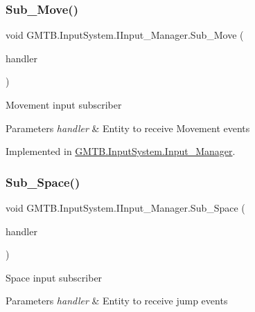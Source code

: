 \subsubsection{\texorpdfstring{Sub\_Move()}{Sub\_Move()}}
{\footnotesize\ttfamily void G\+M\+T\+B.\+Input\+System.\+I\+Input\+\_\+\+Manager.\+Sub\+\_\+\+Move (\begin{DoxyParamCaption}\item[{Event\+Handler$<$ \mbox{\hyperlink{class_g_m_t_b_1_1_input_system_1_1_input_event}{Input\+Event}} $>$}]{handler }\end{DoxyParamCaption})}



Movement input subscriber 


\begin{DoxyParams}{Parameters}
{\em handler} & Entity to receive Movement events\\
\hline
\end{DoxyParams}


Implemented in \mbox{\hyperlink{class_g_m_t_b_1_1_input_system_1_1_input___manager_aa5c3ef995d84d51c4c8d13853b6f18d1}{G\+M\+T\+B.\+Input\+System.\+Input\+\_\+\+Manager}}.

\mbox{\label{interface_g_m_t_b_1_1_input_system_1_1_i_input___manager_afeec586fb787d0e42f3362b1a465004c}} 
\subsubsection{\texorpdfstring{Sub\_Space()}{Sub\_Space()}}
{\footnotesize\ttfamily void G\+M\+T\+B.\+Input\+System.\+I\+Input\+\_\+\+Manager.\+Sub\+\_\+\+Space (\begin{DoxyParamCaption}\item[{Event\+Handler$<$ \mbox{\hyperlink{class_g_m_t_b_1_1_input_system_1_1_input_event}{Input\+Event}} $>$}]{handler }\end{DoxyParamCaption})}



Space input subscriber 


\begin{DoxyParams}{Parameters}
{\em handler} & Entity to receive jump events\\
\hline
\end{DoxyParams}


